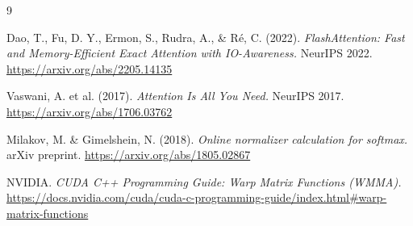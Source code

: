 \documentclass[12pt]{article}
\begin{document}
\begin{thebibliography}{9}

Dao, T., Fu, D. Y., Ermon, S., Rudra, A., \& Ré, C. (2022). 
\textit{FlashAttention: Fast and Memory-Efficient Exact Attention with IO-Awareness.} 
NeurIPS 2022. \url{https://arxiv.org/abs/2205.14135}

Vaswani, A. et al. (2017). 
\textit{Attention Is All You Need.} 
NeurIPS 2017. \url{https://arxiv.org/abs/1706.03762}

Milakov, M. \& Gimelshein, N. (2018). 
\textit{Online normalizer calculation for softmax.} 
arXiv preprint. \url{https://arxiv.org/abs/1805.02867}

NVIDIA. 
\textit{CUDA C++ Programming Guide: Warp Matrix Functions (WMMA).} 
\url{https://docs.nvidia.com/cuda/cuda-c-programming-guide/index.html#warp-matrix-functions}

\end{thebibliography}
\end{document}
